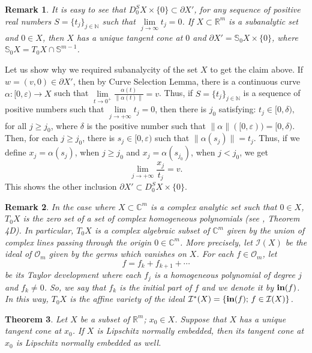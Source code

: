 \documentclass{amsart}
\newtheorem{theorem}{Theorem}[section]
\newtheorem{remark}[theorem]{Remark}
\newcommand{\R}{\mathbb{R}}
\newcommand{\C}{\mathbb{C}}
\newcommand{\N}{\mathbb{N}}
\begin{document}
\begin{remark}
{\rm It is easy to see that $D_0^S X\times \{0\}\subset \partial X'$, for any sequence of positive real numbers $S=\{t_j\}_{j\in \N}$ such that $\lim\limits_{j\to \infty} t_j=0$. If $X\subset \R^m$ is a subanalytic set and $0\in X$, then $X$ has a unique tangent cone at $0$ and $\partial X'=\mathbb{S}_0X\times \{0\}$, where $\mathbb{S}_0X=T_0X\cap \mathbb{S}^{m-1}$.}
\end{remark}
Let us show why we required subanalycity of the set $X$ to get the claim above. If $w=(v,0)\in \partial X'$, then by Curve Selection Lemma, there is a continuous curve $\alpha: [0,\varepsilon)\to X$ such that $\lim\limits _{t\to 0^+}\frac{\alpha(t)}{\|\alpha(t)\|}=v$. Thus, if $S=\{t_j\}_{j\in \N}$ is a sequence of positive numbers such that $\lim\limits _{j\to +\infty } t_j=0$, then there is $j_0$ satisfying: $t_j\in[0,\delta ),$ for all $j\geq j_0$, where $\delta$ is the positive number such that $\|\alpha\|([0,\varepsilon ))=[0,\delta)$. Then, for each $j\geq j_0$, there is $s_j\in [0,\varepsilon )$ such that $\|\alpha(s_j)\|=t_j$. Thus, if we define $x_j=\alpha(s_j)$, when $j\geq j_0$ and $x_j=\alpha(s_{j_0})$, when $j< j_0$, we get
$$
\lim\limits _{j\to +\infty }\frac{x_j}{t_j}=v.
$$
This shows the other inclusion $\partial X'\subset D_0^S X\times \{0\}$. 


\begin{remark}\label{remark-tangent-cone}
{\rm In the case where $X\subset \C^m$ is a complex analytic set such that $0\in X$, $T_{0}X$ is the zero set of a set of complex homogeneous polynomials (see \cite{Whitney:1972}, Theorem 4D). In particular, $T_{0}X$ is a complex algebraic subset of $\C^m$ given by the union of complex lines passing through the origin $0\in\C^m$. More precisely,  let $\mathcal{I}(X)$ be the ideal of $\mathcal{O}_m$ given by the germs which vanishes on $X$. For each $f\in\mathcal{O}_m$, let
$$ f = f_k+f_{k+1}+\cdots $$ be its Taylor development where each $f_j$ is a homogeneous polynomial of degree $j$ and $f_k\neq 0$. So, we say that $f_k$ is the \emph{initial part} of $f$ and we denote it by ${\bf in}(f)$. In this way, $T_0X$ is the affine variety of the ideal $\mathcal{I}^*(X)=\{{\bf in}(f);\, f\in \mathcal{I}(X)\}$}.
\end{remark}



\begin{theorem}\label{ne_set_ne_cone} Let $X$ be a subset of $\R^m$; $x_0\in X$. Suppose that $X$ has a unique tangent cone at $x_0$. If $X$ is Lipschitz normally embedded, then its tangent cone at $x_0$ is Lipschitz normally embedded as well.
\end{theorem}
\end{document}
